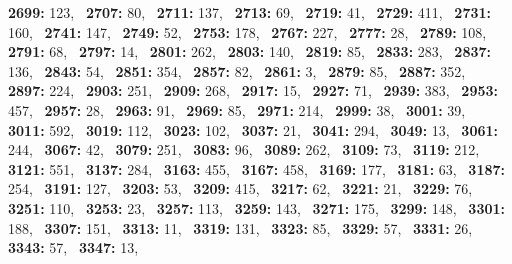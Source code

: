 \textbf{2699:} 123,\allowbreak~ 
\textbf{2707:} 80,\allowbreak~ 
\textbf{2711:} 137,\allowbreak~ 
\textbf{2713:} 69,\allowbreak~ 
\textbf{2719:} 41,\allowbreak~ 
\textbf{2729:} 411,\allowbreak~ 
\textbf{2731:} 160,\allowbreak~ 
\textbf{2741:} 147,\allowbreak~ 
\textbf{2749:} 52,\allowbreak~ 
\textbf{2753:} 178,\allowbreak~ 
\textbf{2767:} 227,\allowbreak~ 
\textbf{2777:} 28,\allowbreak~ 
\textbf{2789:} 108,\allowbreak~ 
\textbf{2791:} 68,\allowbreak~ 
\textbf{2797:} 14,\allowbreak~ 
\textbf{2801:} 262,\allowbreak~ 
\textbf{2803:} 140,\allowbreak~ 
\textbf{2819:} 85,\allowbreak~ 
\textbf{2833:} 283,\allowbreak~ 
\textbf{2837:} 136,\allowbreak~ 
\textbf{2843:} 54,\allowbreak~ 
\textbf{2851:} 354,\allowbreak~ 
\textbf{2857:} 82,\allowbreak~ 
\textbf{2861:} 3,\allowbreak~ 
\textbf{2879:} 85,\allowbreak~ 
\textbf{2887:} 352,\allowbreak~ 
\textbf{2897:} 224,\allowbreak~ 
\textbf{2903:} 251,\allowbreak~ 
\textbf{2909:} 268,\allowbreak~ 
\textbf{2917:} 15,\allowbreak~ 
\textbf{2927:} 71,\allowbreak~ 
\textbf{2939:} 383,\allowbreak~ 
\textbf{2953:} 457,\allowbreak~ 
\textbf{2957:} 28,\allowbreak~ 
\textbf{2963:} 91,\allowbreak~ 
\textbf{2969:} 85,\allowbreak~ 
\textbf{2971:} 214,\allowbreak~ 
\textbf{2999:} 38,\allowbreak~ 
\textbf{3001:} 39,\allowbreak~ 
\textbf{3011:} 592,\allowbreak~ 
\textbf{3019:} 112,\allowbreak~ 
\textbf{3023:} 102,\allowbreak~ 
\textbf{3037:} 21,\allowbreak~ 
\textbf{3041:} 294,\allowbreak~ 
\textbf{3049:} 13,\allowbreak~ 
\textbf{3061:} 244,\allowbreak~ 
\textbf{3067:} 42,\allowbreak~ 
\textbf{3079:} 251,\allowbreak~ 
\textbf{3083:} 96,\allowbreak~ 
\textbf{3089:} 262,\allowbreak~ 
\textbf{3109:} 73,\allowbreak~ 
\textbf{3119:} 212,\allowbreak~ 
\textbf{3121:} 551,\allowbreak~ 
\textbf{3137:} 284,\allowbreak~ 
\textbf{3163:} 455,\allowbreak~ 
\textbf{3167:} 458,\allowbreak~ 
\textbf{3169:} 177,\allowbreak~ 
\textbf{3181:} 63,\allowbreak~ 
\textbf{3187:} 254,\allowbreak~ 
\textbf{3191:} 127,\allowbreak~ 
\textbf{3203:} 53,\allowbreak~ 
\textbf{3209:} 415,\allowbreak~ 
\textbf{3217:} 62,\allowbreak~ 
\textbf{3221:} 21,\allowbreak~ 
\textbf{3229:} 76,\allowbreak~ 
\textbf{3251:} 110,\allowbreak~ 
\textbf{3253:} 23,\allowbreak~ 
\textbf{3257:} 113,\allowbreak~ 
\textbf{3259:} 143,\allowbreak~ 
\textbf{3271:} 175,\allowbreak~ 
\textbf{3299:} 148,\allowbreak~ 
\textbf{3301:} 188,\allowbreak~ 
\textbf{3307:} 151,\allowbreak~ 
\textbf{3313:} 11,\allowbreak~ 
\textbf{3319:} 131,\allowbreak~ 
\textbf{3323:} 85,\allowbreak~ 
\textbf{3329:} 57,\allowbreak~ 
\textbf{3331:} 26,\allowbreak~ 
\textbf{3343:} 57,\allowbreak~ 
\textbf{3347:} 13,\allowbreak~ 

